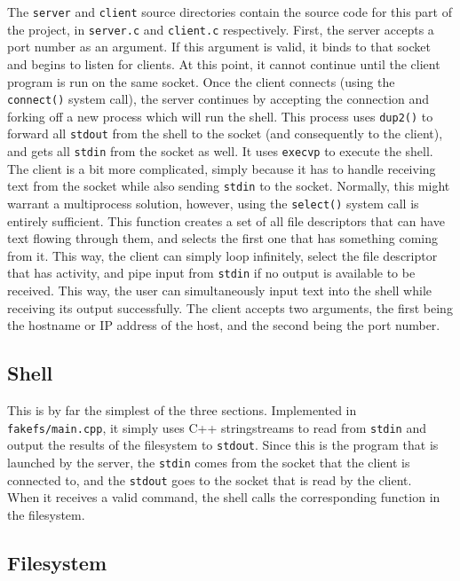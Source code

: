 \documentclass[twoside]{article}
\begin{document}
\begin{multicols}{2}
The \texttt{server} and \texttt{client} source directories contain the source
code for this part of the project, in \texttt{server.c} and \texttt{client.c}
respectively. First, the server accepts a port number as an argument. If this
argument is valid, it binds to that socket and begins to listen for clients. At
this point, it cannot continue until the client program is run on the same
socket. Once the client connects (using the \texttt{connect()} system call), the
server continues by accepting the connection and forking off a new process which
will run the shell. This process uses \texttt{dup2()} to forward all
\texttt{stdout} from the shell to the socket (and consequently to the client),
and gets all \texttt{stdin} from the socket as well. It uses \texttt{execvp} to
execute the shell.
\\
The client is a bit more complicated, simply because it has to handle receiving
text from the socket while also sending \texttt{stdin} to the socket. Normally,
this might warrant a multiprocess solution, however, using the \texttt{select()}
system call is entirely sufficient. This function creates a set of all file
descriptors that can have text flowing through them, and selects the first one
that has something coming from it. This way, the client can simply loop
infinitely, select the file descriptor that has activity, and pipe input from
\texttt{stdin} if no output is available to be received. This way, the user can
simultaneously input text into the shell while receiving its output
successfully. The client accepts two arguments, the first being the hostname or
IP address of the host, and the second being the port number.

\subsection{Shell}

This is by far the simplest of the three sections. Implemented in
\texttt{fakefs/main.cpp}, it simply uses C++ stringstreams to read from
\texttt{stdin} and output the results of the filesystem to \texttt{stdout}.
Since this is the program that is launched by the server, the \texttt{stdin}
comes from the socket that the client is connected to, and the \texttt{stdout}
goes to the socket that is read by the client.
\\
When it receives a valid command, the shell calls the corresponding function in
the filesystem.

\subsection{Filesystem}


\end{multicols}
\end{document}
